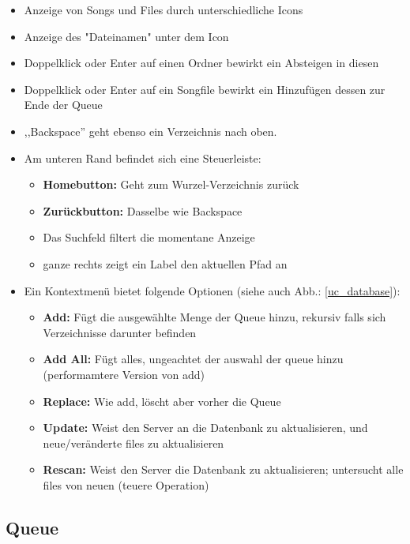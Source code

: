 \begin{itemize}
    \item Anzeige von Songs und Files durch unterschiedliche Icons
    \item Anzeige des "Dateinamen" unter dem Icon
    \item Doppelklick oder Enter auf einen Ordner bewirkt ein Absteigen in diesen
    \item Doppelklick oder Enter auf ein Songfile bewirkt ein Hinzufügen dessen zur Ende der Queue
    \item ,,Backspace'' geht ebenso ein Verzeichnis nach oben.
    \item Am unteren Rand befindet sich eine Steuerleiste:
        \begin{itemize}
            \item \textbf{Homebutton:} Geht zum Wurzel-Verzeichnis zurück
            \item \textbf{Zurückbutton:} Dasselbe wie Backspace
            \item Das Suchfeld filtert die momentane Anzeige
            \item ganze rechts zeigt ein Label den aktuellen Pfad an
        \end{itemize}
    \item Ein Kontextmenü bietet folgende Optionen (siehe auch Abb.: \ref{uc_database}):
        \begin{itemize}
            \item \textbf{Add:} Fügt die ausgewählte Menge der Queue hinzu, rekursiv falls sich Verzeichnisse darunter befinden
            \item \textbf{Add All:} Fügt alles, ungeachtet der auswahl der queue hinzu (performamtere Version von add)
            \item \textbf{Replace:} Wie add, löscht aber vorher die Queue
            \item \textbf{Update:} Weist den Server an die Datenbank zu aktualisieren, und neue/veränderte files zu aktualisieren
            \item \textbf{Rescan:} Weist den Server die Datenbank zu aktualisieren; untersucht alle files von neuen (teuere Operation)
        \end{itemize}
\end{itemize}


\subsection{Queue}

